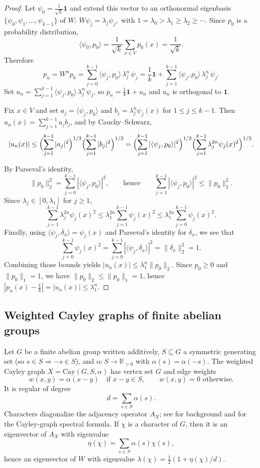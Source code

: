 \documentclass[11pt,reqno]{article}
\numberwithin{equation}{section}
\theoremstyle{plain}
\theoremstyle{definition}
\theoremstyle{remark}
\newcommand{\R}{\mathbb{R}}
\begin{document}
\begin{proof}
Let $\psi_0=\frac{1}{\sqrt{k}}\mathbf{1}$ and extend this vector to an orthonormal eigenbasis
$\{\psi_0,\psi_1,\dots,\psi_{k-1}\}$ of $W$: $W\psi_j=\lambda_j\psi_j,$ with
$1=\lambda_0>\lambda_1\ge \lambda_2\ge \cdots$.
Since $p_0$ is a probability distribution,
\[
\langle \psi_0,p_0\rangle=\frac{1}{\sqrt{k}}\sum_{x\in V}p_0(x)=\frac{1}{\sqrt{k}}.
\]
Therefore
\[
p_n=W^n p_0=\sum_{j=0}^{k-1}\langle \psi_j,p_0\rangle\,\lambda_j^n\,\psi_j
=\frac{1}{k}\mathbf{1}+\sum_{j=1}^{k-1}\langle \psi_j,p_0\rangle\,\lambda_j^n\,\psi_j.
\]
Set $u_n=\sum_{j=1}^{k-1}\langle \psi_j,p_0\rangle\,\lambda_j^n\,\psi_j$, so $p_n=\frac{1}{k}\mathbf{1}+u_n$
and $u_n$ is orthogonal to $\mathbf{1}$.

Fix $x\in V$ and set $a_j=\langle \psi_j,p_0\rangle$ and $b_j=\lambda_j^{n}\psi_j(x)$ for $1\le j\le k-1$.
Then $u_n(x)=\sum_{j=1}^{k-1} a_j b_j$, and by Cauchy--Schwarz,
\[
|u_n(x)|
\le \Bigl(\sum_{j=1}^{k-1} |a_j|^2\Bigr)^{1/2}\Bigl(\sum_{j=1}^{k-1} |b_j|^2\Bigr)^{1/2}
= \Bigl(\sum_{j=1}^{k-1}|\langle \psi_j,p_0\rangle|^2\Bigr)^{1/2}
\Bigl(\sum_{j=1}^{k-1}\lambda_j^{2n}\psi_j(x)^2\Bigr)^{1/2}.
\]

By Parseval's identity,
\[
\|p_0\|_2^2=\sum_{j=0}^{k-1}|\langle \psi_j,p_0\rangle|^2,
\qquad\text{hence}\qquad
\sum_{j=1}^{k-1}|\langle \psi_j,p_0\rangle|^2\le \|p_0\|_2^2.
\]
Since $\lambda_j\in[0,\lambda_1]$ for $j\ge1$,
\[
\sum_{j=1}^{k-1}\lambda_j^{2n}\psi_j(x)^2
\le \lambda_1^{2n}\sum_{j=1}^{k-1}\psi_j(x)^2
\le \lambda_1^{2n}\sum_{j=0}^{k-1}\psi_j(x)^2.
\]
Finally, using $\langle \psi_j,\delta_x\rangle=\psi_j(x)$ and Parseval's identity for $\delta_x$, we see that
\[
\sum_{j=0}^{k-1}\psi_j(x)^2=\sum_{j=0}^{k-1}|\langle \psi_j,\delta_x\rangle|^2=\|\delta_x\|_2^2=1.
\]
Combining those bounds yields $|u_n(x)|\le \lambda_1^n\|p_0\|_2$.
Since $p_0\ge0$ and $\|p_0\|_1=1$, we have $\|p_0\|_2\le \|p_0\|_1=1$, hence
$|p_n(x)-\tfrac1k|=|u_n(x)|\le \lambda_1^n$.
\end{proof}

\subsection{Weighted Cayley graphs of finite abelian groups}

Let $G$ be a finite abelian group written additively, $S\subseteq G$ a symmetric generating set (so $s\in S\Rightarrow -s\in S$),
and $\alpha\colon S\to\R_{>0}$ with $\alpha(s)=\alpha(-s)$.
The weighted Cayley graph $X=\mathrm{Cay}(G,S,\alpha)$ has vertex set $G$ and edge weights
\[
w(x,y)=\alpha(x-y)\quad\text{if }x-y\in S,\qquad w(x,y)=0\text{ otherwise}.
\]
It is regular of degree
\[
d=\sum_{s\in S}\alpha(s).
\]
Characters diagonalize the adjacency operator $A_X$; see \cite{CR62} for background and \cite[Cor.~3.2]{Ba79} for the Cayley-graph spectral formula.
If $\chi$ is a character of $G$, then it is an eigenvector of $A_X$ with eigenvalue
\[
\eta(\chi)=\sum_{s\in S}\alpha(s)\chi(s),
\]
hence an eigenvector of $W$ with eigenvalue $\lambda(\chi)=\frac12\left(1+\eta(\chi)/d\right)$.
\end{document}
